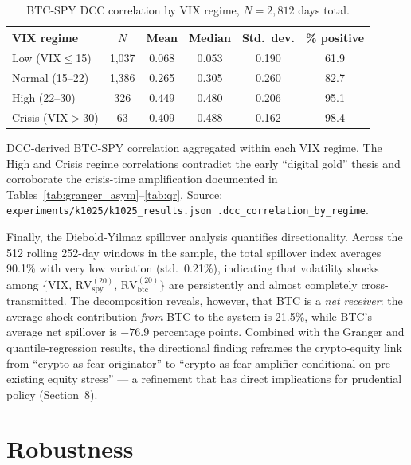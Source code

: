 \documentclass[11pt,a4paper]{article}
\begin{document}
\begin{table}[H]
\centering
\caption{BTC-SPY DCC correlation by VIX regime, $N = 2{,}812$ days total.}
\label{tab:dcc}
\begin{tabular}{lccccc}
\toprule
VIX regime    & $N$  & Mean & Median & Std.\ dev. & \% positive \\
\midrule
Low (VIX$\le$15)        & 1{,}037 & 0.068 & 0.053 & 0.190 & 61.9 \\
Normal (15--22)         & 1{,}386 & 0.265 & 0.305 & 0.260 & 82.7 \\
High (22--30)           & 326   & 0.449 & 0.480 & 0.206 & 95.1 \\
Crisis (VIX$>$30)       & 63    & 0.409 & 0.488 & 0.162 & 98.4 \\
\bottomrule
\end{tabular}
\begin{flushleft}
\footnotesize DCC-derived BTC-SPY correlation aggregated within each VIX regime. The High and Crisis regime correlations contradict the early ``digital gold'' thesis and corroborate the crisis-time amplification documented in Tables~\ref{tab:granger_asym}--\ref{tab:qr}. Source: \texttt{experiments/k1025/k1025\_results.json .dcc\_correlation\_by\_regime}.
\end{flushleft}
\end{table}

Finally, the Diebold-Yilmaz spillover analysis quantifies directionality. Across the 512 rolling 252-day windows in the sample, the total spillover index averages 90.1\% with very low variation (std.\ 0.21\%), indicating that volatility shocks among $\{$VIX, $\text{RV}^{(20)}_{\text{spy}}$, $\text{RV}^{(20)}_{\text{btc}}\}$ are persistently and almost completely cross-transmitted. The decomposition reveals, however, that BTC is a \emph{net receiver}: the average shock contribution \emph{from} BTC to the system is 21.5\%, while BTC's average net spillover is $-76.9$ percentage points.%
 Combined with the Granger and quantile-regression results, the directional finding reframes the crypto-equity link from ``crypto as fear originator'' to ``crypto as fear amplifier conditional on pre-existing equity stress'' --- a refinement that has direct implications for prudential policy (Section~8).

\section{Robustness}
\label{sec:robustness}
\end{document}

